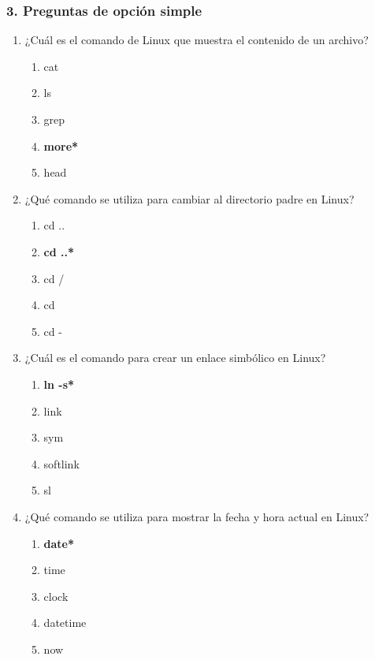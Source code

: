 \documentclass[11pt,twoside]{book}
\begin{document}
\subsubsection{3. Preguntas de opción simple }

\begin{enumerate}[label=\textbf{\arabic*.}, leftmargin=2cm]

    \item ¿Cuál es el comando de Linux que muestra el contenido de un archivo?
    \begin{enumerate}[label=\Alph*.]
        \item cat
        \item ls
        \item grep
        \item \textbf{more*}
        \item head
    \end{enumerate}

    \item ¿Qué comando se utiliza para cambiar al directorio padre en Linux?
    \begin{enumerate}[label=\Alph*.]
        \item cd ..
        \item \textbf{cd ..*}
        \item cd /
        \item cd ~
        \item cd -
    \end{enumerate}

    \item ¿Cuál es el comando para crear un enlace simbólico en Linux?
    \begin{enumerate}[label=\Alph*.]
        \item  \textbf {ln -s*}
        \item link
        \item sym
        \item softlink
        \item sl
    \end{enumerate}

    \item ¿Qué comando se utiliza para mostrar la fecha y hora actual en Linux?
    \begin{enumerate}[label=\Alph*.]
        \item \textbf{date*}
        \item time
        \item clock
        \item datetime
        \item now
    \end{enumerate}


\end{enumerate}
\end{document}
